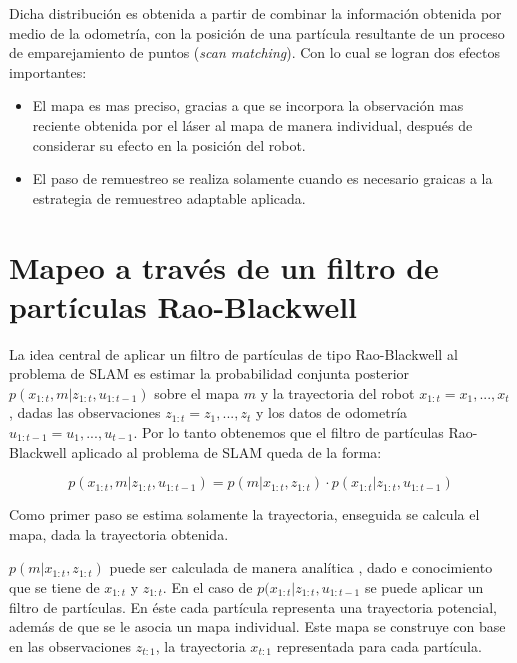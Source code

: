 \documentclass[10pt,a4paper]{article}
\begin{document}
Dicha distribución es obtenida a partir de combinar la información obtenida por medio de la odometría, con la posición de una partícula resultante de un proceso de emparejamiento de puntos (\emph{scan matching}). Con lo cual se logran dos efectos importantes:

\begin{itemize}

\item El mapa es mas preciso, gracias a que se incorpora la observación mas reciente obtenida por el láser al mapa de manera individual, después de considerar su efecto en la posición del robot.

\item El paso de remuestreo se realiza solamente cuando es necesario graicas a la estrategia de remuestreo adaptable aplicada.

\end{itemize}






\section{Mapeo a través de un filtro de partículas Rao-Blackwell}

La idea central de aplicar un filtro de partículas de tipo Rao-Blackwell al problema de SLAM es estimar la probabilidad conjunta posterior $ p(x_{1:t},m | z_{1:t},u_{1:t-1}) $ sobre el mapa $ m $ y la trayectoria del robot $ x_{1:t} = x_{1},...,x_{t} $, dadas las observaciones $ z_{1:t} = z_{1},...,z_{t} $ y los datos de odometría $ u_{1:t-1} = u_{1},...,u_{t-1} $. Por lo tanto obtenemos que el filtro de partículas Rao-Blackwell aplicado al problema de SLAM queda de la forma:

\begin{equation}
	p(x_{1:t},m | z_{1:t},u_{1:t-1}) = 
		p(m | x_{1:t}, z_{1:t}) \cdot p(x_{1:t} | z_{1:t},u_{1:t-1})
\end{equation}

Como primer paso se estima solamente la trayectoria, enseguida se calcula el mapa, dada la trayectoria obtenida.

$ p(m | x_{1:t}, z_{1:t}) $ puede ser calculada de manera analítica \cite{moravec1988sensor}, dado e conocimiento que se tiene de $ x_{1:t} $ y $ z_{1:t} $. En el caso de $ p(x_{1:t} | z_{1:t},u_{1:t-1} $ se puede aplicar un filtro de partículas. En éste cada partícula representa una trayectoria potencial, además de que se le asocia un mapa individual. Este mapa se construye con base en las observaciones $z_{t:1}$, la trayectoria $x_{t:1}$ representada para cada partícula.
\end{document}
